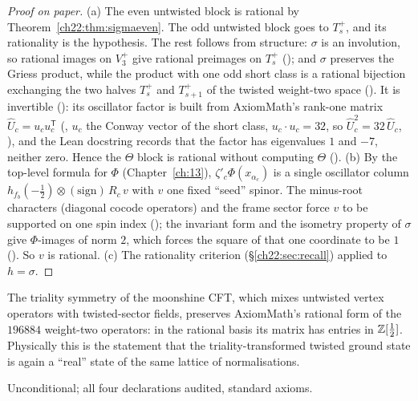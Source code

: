 \begin{proof}[Proof on paper]
(a) The even untwisted block is rational by Theorem~\ref{ch22:thm:sigmaeven}.  The odd untwisted block goes to $T_s^+$, and
its rationality is the hypothesis.  The rest follows from structure: $\sigma$ is an involution, so rational images on
$V_3^+$ give rational preimages on $T_s^+$ (); and $\sigma$ preserves the Griess product, while
the product with one odd short class is a rational bijection exchanging the two halves $T_s^+$ and $T_{s+1}^+$ of the
twisted weight-two space ().  It is invertible (): its oscillator factor is built from
AxiomMath's rank-one matrix $\widehat U_c=u_cu_c^{\mathsf T}$ (, $u_c$ the Conway vector of the short class, $u_c\cdot u_c=32$,
so $\widehat U_c^2=32\,\widehat U_c$, ), and the Lean docstring records that the factor has eigenvalues $1$ and $-7$, neither
zero.  Hence the $\Theta$ block is rational without computing $\Theta$ ().
(b) By the top-level formula for $\Phi$ (Chapter~\ref{ch:13}), $\zeta'_c\Phi(x_{\alpha_c})$ is a single oscillator column
$h_{f_b}(-\tfrac12)\otimes(\text{sign})\,R_c\,v$ with $v$ one fixed ``seed'' spinor.  The minus-root characters (diagonal
cocode operators) and the frame sector force $v$ to be supported on one spin index
(); the invariant form and the isometry property of $\sigma$ give $\Phi$-images of norm
$2$, which forces the square of that one coordinate to be $1$ ().  So $v$ is rational.
(c) The rationality criterion  (\S\ref{ch22:sec:recall}) applied to $h=\sigma$.
\end{proof}
\begin{physics}
The triality symmetry of the moonshine CFT, which mixes untwisted vertex operators with twisted-sector fields, preserves
AxiomMath's rational form of the $196884$ weight-two operators: in the rational basis its matrix has entries in
${\mathbb{Z}}[\tfrac12]$.  Physically this is the statement that the triality-transformed twisted ground state is again a ``real''
state of the same lattice of normalisations.
\end{physics}
\begin{status}Unconditional; all four declarations audited, standard axioms.\end{status}

